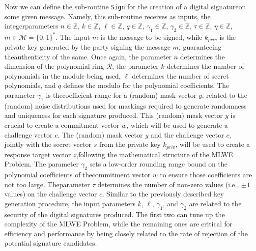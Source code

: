 \documentclass[runningheads]{llncs}
\numberwithin{equation}{section}
\begin{document}
    Now we can define the sub-routine \texttt{Sign} for the creation of a digital signature\break on some given message. Namely, this sub-routine receives as inputs, the integer\break parameters $n \in \mathbb{Z}$, $k \in \mathbb{Z}$, $\ell \in \mathbb{Z}$, $q \in \mathbb{Z}$,  ${\gamma}_{1} \in \mathbb{Z}$, ${\gamma}_{2} \in \mathbb{Z}$, $\tau \in \mathbb{Z}$, $\eta \in \mathbb{Z}$, $m \in \mathcal{M} = { \{0, 1\} }^{*}$. The input $m$ is the message to be signed, while ${k}_{priv}$ is the private key generated by the party signing the message $m$, guaranteeing the\break authenticity of the same. Once again, the parameter $n$ determines the dimension of the polynomial ring $\mathcal{R}$, the parameter $k$ determines the number of polynomials in the module being used, $\ell$ determines the number of secret polynomials, and $q$ defines the modulo for the polynomial coefficients. The parameter ${\gamma}_{1}$ is the\break coefficient range for a (random) mask vector $y$, related to the (random) noise distributions used for maskings required to generate randomness and uniqueness for each signature produced. This (random) mask vector $y$ is crucial to create a commitment vector $w$, which will be used to generate a challenge vector $c$. The (random) mask vector $y$ and the challenge vector $c$, jointly with the secret vector $s$ from the private key ${k}_{priv}$, will be used to create a response target vector $z$,\break following the mathematical structure of the MLWE Problem. The parameter ${\gamma}_{2}$ sets a low-order rounding range bound on the polynomial coefficients of the\break commitment vector $w$ to ensure those coefficients are not too large. The\break parameter $\tau$ determines the number of non-zero values (i.e., $\pm 1$ values) on the challenge vector $c$. Similar to the previously described key generation procedure, the input parameters $k$, $\ell$, ${\gamma}_{1}$, and ${\gamma}_{2}$ are related to the security of the digital signatures produced. The first two can tune up the complexity of the MLWE Problem, while the remaining ones are critical for efficiency and performance by being closely related to the rate of rejection of the potential signature candidates.

    \vspace{1ex}
    
\end{document}
